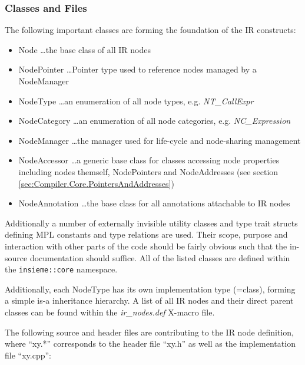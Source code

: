 \subsubsection{Classes and Files}
The following important classes are forming the foundation of the IR
constructs:
\begin{itemize}
  \item Node \ldots the base class of all IR nodes
  \item NodePointer \ldots Pointer type used to reference nodes managed by a
  NodeManager
  \item NodeType \ldots an enumeration of all node types, e.g.
  \textit{NT\_CallExpr}
  \item NodeCategory \ldots an enumeration of all node categories, e.g.
  \textit{NC\_Expression}
  \item NodeManager \ldots the manager used for life-cycle and node-sharing
  management
  \item NodeAccessor \dots a generic base class for classes accessing node
  properties including nodes themself, NodePointers and NodeAddresses (see
  section \ref{sec:Compiler.Core.PointersAndAddresses})
  \item NodeAnnotation \dots the base class for all annotations attachable to
  IR nodes
\end{itemize}
Additionally a number of externally invisible utility classes and type trait
structs defining MPL constants and type relations are used. Their scope, purpose
and interaction with other parts of the code should be fairly obvious such
that the in-source documentation should suffice. All of the listed classes are
defined within the \lstinline|insieme::core| namespace.

Additionally, each NodeType has its own implementation type (=class), forming a
simple is-a inheritance hierarchy. A list of all IR nodes and their direct
parent classes can be found within the \textit{ir\_nodes.def} X-macro file.

The following source and header files are contributing to the IR node
definition, where ``xy.*'' corresponds to the header file ``xy.h'' as well as the
implementation file ``xy.cpp'':

